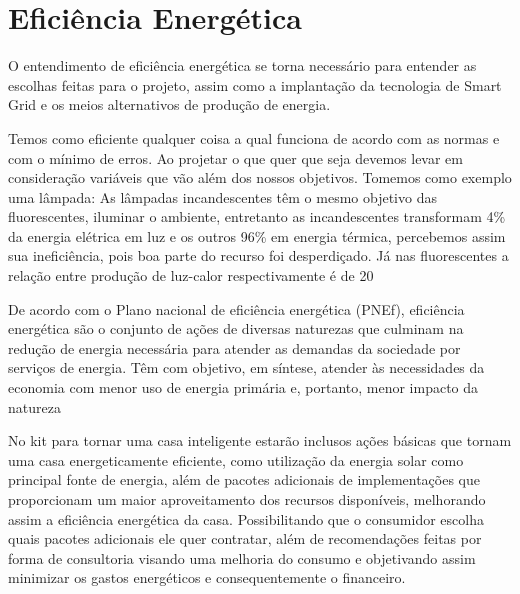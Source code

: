 \section{Eficiência Energética}
\par O entendimento de eficiência energética se torna necessário para entender as escolhas feitas para o projeto, assim como a implantação da tecnologia de Smart Grid e os meios alternativos de produção de energia.
\par Temos como eficiente qualquer coisa a qual funciona de acordo com as normas e com o mínimo de erros. Ao projetar o que quer que seja devemos levar em consideração variáveis que vão além dos nossos objetivos. Tomemos como exemplo uma lâmpada: As lâmpadas incandescentes têm o mesmo objetivo das fluorescentes, iluminar o ambiente, entretanto as incandescentes transformam 4\% da energia elétrica em luz e os outros 96\% em energia térmica, percebemos assim sua ineficiência, pois boa parte do recurso foi desperdiçado. Já nas fluorescentes a relação entre produção de luz-calor respectivamente é de 20%
\par De acordo com o Plano nacional de eficiência energética (PNEf), eficiência energética são o conjunto de ações de diversas naturezas que culminam na redução de energia necessária para atender as demandas da sociedade por serviços de energia. Têm com objetivo, em síntese, atender às necessidades da economia com menor uso de energia primária e, portanto, menor impacto da natureza
\par No kit para tornar uma casa inteligente estarão inclusos ações básicas que tornam uma casa energeticamente eficiente, como utilização da energia solar como principal fonte de energia, além de pacotes adicionais de implementações que proporcionam um maior aproveitamento dos recursos disponíveis, melhorando assim a eficiência energética da casa. Possibilitando que o consumidor escolha quais pacotes adicionais ele quer contratar, além de recomendações feitas por forma de consultoria visando uma melhoria do consumo e objetivando assim minimizar os gastos energéticos e consequentemente o financeiro.

